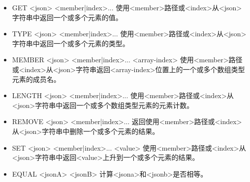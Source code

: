 \begin{itemize}
\item 
GET <json> <member|index>... 使用<member>路径或<index>从<json>字符串中返回一个或多个元素的值。

\item 
TYPE <json> <member|index>... 使用<member>路径或<index>从<json>字符串中返回一个或多个元素的类型。

\item 
MEMBER <json> <member|index>... <array-index> 使用<member>路径或<index>从<json>字符串返回<array-index>位置上的一个或多个数组类型元素的成员名。

\item 
LENGTH <json> <member|index>... 使用<member>路径或<index>从<json>字符串中返回一个或多个数组类型元素的元素计数。

\item
REMOVE <json> <member|index>... 返回使用<member>路径或<index>从<json>字符串中删除一个或多个元素的结果。

\item
SET <json> <member|index>... <value> 使用<member>路径或<index>从<json>字符串中返回<value>上升到一个或多个元素的结果。

\item
EQUAL <jsonA> <jsonB> 计算<jsona>和<jsonb>是否相等。
\end{itemize}





















